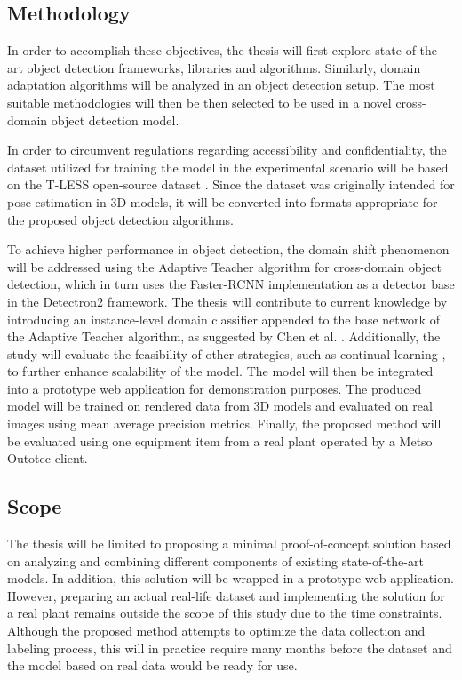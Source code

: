 \documentclass[english, 12pt, a4paper, elec, utf8, a-1b, online]{aaltothesis}
\begin{document}
\subsection{Methodology}
In order to accomplish these objectives, the thesis will first explore state-of-the-art object detection frameworks, libraries and algorithms. Similarly, domain adaptation algorithms will be analyzed in an object detection setup. The most suitable methodologies will then be then selected to be used in a novel cross-domain object detection model.  

In order to circumvent regulations regarding accessibility and confidentiality, the dataset utilized for training the model in the experimental scenario will be based on the T-LESS open-source dataset \cite{hodan2017tless}. Since the dataset was originally intended for pose estimation in 3D models, it will be converted into formats appropriate for the proposed object detection algorithms.

To achieve higher performance in object detection, the domain shift phenomenon will be addressed using the Adaptive Teacher \cite{Li2021} algorithm for cross-domain object detection, which in turn uses the Faster-RCNN \cite{ima} implementation as a detector base in the Detectron2 \cite{wu2019Detectron2} framework.  The thesis will contribute to current knowledge by introducing an instance-level domain classifier appended to the base network of the Adaptive Teacher algorithm, as suggested by Chen et al. \cite{Chen2018}. Additionally, the study will evaluate the feasibility of other strategies, such as continual learning \cite{Parisi2018}, to further enhance scalability of the model. The model will then be integrated into a prototype web application for demonstration purposes. The produced model will be trained on rendered data from 3D models and evaluated on real images using mean average precision metrics. Finally, the proposed method will be evaluated using one equipment item from a real plant operated by a Metso Outotec client.

\clearpage

\subsection{Scope}

The thesis will be limited to proposing a minimal proof-of-concept solution based on analyzing and combining different components of existing state-of-the-art models. In addition, this solution will be wrapped in a prototype web application. However, preparing an actual real-life dataset and implementing the solution for a real plant remains outside the scope of this study due to the time constraints. Although the proposed method attempts to optimize the data collection and labeling process, this will in practice require many months before the dataset and the model based on real data would be ready for use. 
\end{document}
